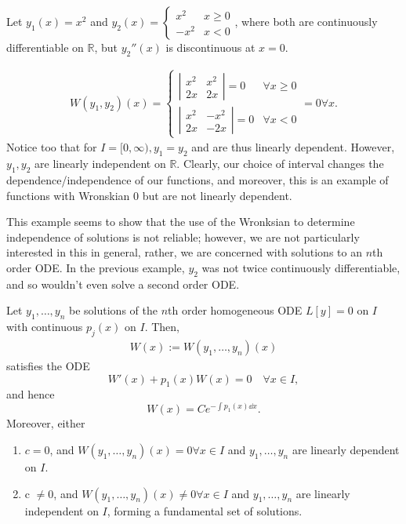 \begin{example}
    Let $y_1(x) = x^2$ and $y_2(x) = \begin{cases}
        x^2 & x \geq 0\\
        -x^2 & x < 0
    \end{cases}$, where both are continuously differentiable on $\mathbb{R}$, but $y_2''(x)$ is discontinuous at $x = 0$.

    \begin{align*}
        W(y_1, y_2)(x) = \begin{cases}
            \left|\begin{matrix}
                x^2 & x^2\\
                2x & 2x
            \end{matrix}\right| = 0 & \forall x \geq 0\\
            \left|\begin{matrix}
                x^2 & - x^2\\
                2x & -2x
            \end{matrix}\right| = 0 & \forall x < 0 
        \end{cases} = 0 \forall x.
    \end{align*}
    Notice too that for $I = [0, \infty), y_1 = y_2$ and are thus linearly dependent. However, $y_1, y_2$ are linearly independent on $\mathbb{R}$. Clearly, our choice of interval changes the dependence/independence of our functions, and moreover, this is an example of functions with Wronskian 0 but are not linearly dependent. 
\end{example}

This example seems to show that the use of the Wronksian to determine independence of solutions is not reliable; however, we are not particularly interested in this in general, rather, we are concerned with solutions to an $n$th order ODE. In the previous example, $y_2$ was not twice continuously differentiable, and so wouldn't even solve a second order ODE.

\begin{theorem}[Abel's]\label{thm:abels}
    Let $y_1, \dots, y_n$ be solutions of the $n$th order homogeneous ODE $L[y] = 0$ on $I$ with continuous $p_{j}(x)$ on $I$. Then, \begin{align*}
        W(x) := W(y_1, \dots, y_n)(x)
    \end{align*}
    satisfies the ODE \[
    W'(x) + p_1(x)W(x) = 0 \quad \forall x \in I,    
    \]
    and hence \[
    W(x) = Ce^{- \int p_1(x) \dd{x}}.    
    \]
    Moreover, either \begin{enumerate}
        \item $c = 0$, and $W(y_1, \dots, y_n)(x) = 0 \forall x \in I$ and $y_1, \dots, y_n$ are linearly dependent on $I$.
        \item c $\neq 0$, and $W(y_1, \dots, y_n)(x) \neq 0 \forall x \in I$ and $y_1, \dots, y_n$ are linearly independent on $I$, forming a fundamental set of solutions.
    \end{enumerate}
\end{theorem}